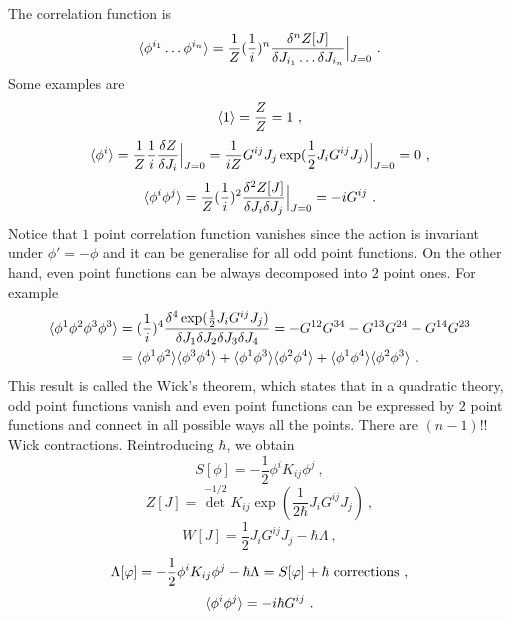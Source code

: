     The correlation function is
    \begin{equation*}
        \langle\phi^{i_1} \ldots \phi^{i_n}\rangle = \frac{1}{Z} (\frac{1}{i})^n \frac{\delta^n Z[J]}{\delta J_{i_1} \ldots \delta J_{i_n}} \Big \vert_{J=0} ~.
    \end{equation*}
    Some examples are 
    \begin{equation*}
        \langle1\rangle = \frac{Z}{Z} = 1 ~,
    \end{equation*}
    \begin{equation*}
        \langle\phi^i\rangle = \frac{1}{Z} \frac{1}{i} \frac{\delta Z}{\delta J_i} \Big \vert_{J=0} = \frac{1}{iZ} G^{ij} J_j \exp(\frac{1}{2} J_i G^{ij} J_j) \Big \vert_{J=0} = 0 ~,
    \end{equation*}
    \begin{equation*}
        \langle\phi^i \phi^j\rangle = \frac{1}{Z} (\frac{1}{i})^2 \frac{\delta^2 Z[J]}{\delta J_{i} \delta J_j} \Big \vert_{J=0} = - i G^{ij} ~.
    \end{equation*}
    Notice that $1$ point correlation function vanishes since the action is invariant under $\phi' = - \phi$ and it can be generalise for all odd point functions. On the other hand, even point functions can be always decomposed into $2$ point ones. For example 
    \begin{equation*}
    \begin{aligned}
        \langle\phi^1 \phi^2 \phi^3 \phi^3\rangle & = (\frac{1}{i})^4 \frac{\delta^4 \exp(\frac{1}{2} J_i G^{ij} J_j)}{\delta J_1 \delta J_2 \delta J_3 \delta J_4} = - G^{12} G^{34} - G^{13} G^{24} - G^{14} G^{23} \\ & =  \langle\phi^1 \phi^2\rangle \langle\phi^3 \phi^4\rangle + \langle\phi^1 \phi^3\rangle \langle\phi^2 \phi^4\rangle + \langle\phi^1 \phi^4\rangle \langle\phi^2 \phi^3\rangle ~. 
    \end{aligned}
    \end{equation*}
    This result is called the Wick's theorem, which states that in a quadratic theory, odd point functions vanish and even point functions can be expressed by $2$ point functions and connect in all possible ways all the points. There are $(n - 1)!!$ Wick contractions. Reintroducing $\hbar$, we obtain 
    \begin{equation*}
        S[\phi] = - \frac{1}{2} \phi^i K_{ij} \phi^j ~,
    \end{equation*}
    \begin{equation*}
        Z[J] = \det^{-1/2} K_{ij} \exp(\frac{1}{2 \hbar} J_i G^{ij} J_j) ~,
    \end{equation*}
    \begin{equation*}
        W[J] = \frac{1}{2} J_i G^{ij} J_j - \hbar \Lambda ~,
    \end{equation*}
    \begin{equation*}
        \Lambda[\varphi] = - \frac{1}{2} \phi^i K_{ij} \phi^j - \hbar \Lambda = S[\varphi] + \hbar \textnormal{~corrections} ~,
    \end{equation*}
    \begin{equation*}
        \langle\phi^i \phi^j\rangle = - i \hbar G^{ij} ~.
    \end{equation*}

